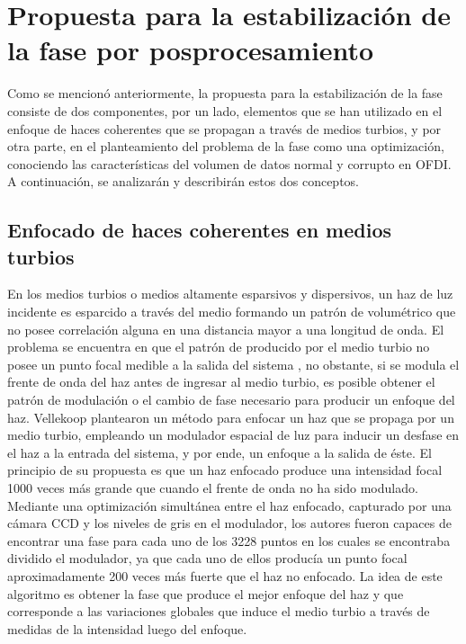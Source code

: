 \section{Propuesta para la estabilización de la fase por posprocesamiento}
\label{sec:propuesta_estabilidad_ofdi}

Como se mencionó anteriormente, la propuesta para la estabilización de la fase consiste de dos componentes, por un lado, elementos que se han utilizado en el enfoque de haces coherentes que se propagan a través de medios turbios, y por otra parte, en el planteamiento del problema de la fase como una optimización, conociendo las características del volumen de datos normal y corrupto en OFDI. A continuación, se analizarán y describirán estos dos conceptos.

\subsection{Enfocado de haces coherentes en medios turbios}

En los medios turbios o medios altamente esparsivos y dispersivos, un haz de luz incidente es esparcido a través del medio formando un patrón de \speckle volumétrico que no posee correlación alguna en una distancia mayor a una longitud de onda. El problema se encuentra en que el patrón de \speckle producido por el medio turbio no posee un punto focal medible a la salida del sistema \cite{Vallekoop2007,Cui2011}, no obstante, si se modula el frente de onda del haz antes de ingresar al medio turbio, es posible obtener el patrón de modulación o el cambio de fase necesario para producir un enfoque del haz. Vellekoop \etal \cite{Vallekoop2007} plantearon un método para enfocar un haz que se propaga por un medio turbio, empleando un modulador espacial de luz para inducir un desfase en el haz a la entrada del sistema, y por ende, un enfoque a la salida de éste. El principio de su propuesta es que un haz enfocado produce una intensidad focal 1000 veces más grande que cuando el frente de onda no ha sido modulado. Mediante una optimización simultánea entre el haz enfocado, capturado por una cámara CCD y los niveles de gris en el modulador, los autores fueron capaces de encontrar una fase para cada uno de los 3228 puntos en los cuales se encontraba dividido el modulador, ya que cada uno de ellos producía un punto focal aproximadamente 200 veces más fuerte que el haz no enfocado. La idea de este algoritmo es obtener la fase que produce el mejor enfoque del haz y que corresponde a las variaciones globales que induce el medio turbio a través de medidas de la intensidad luego del enfoque. 

